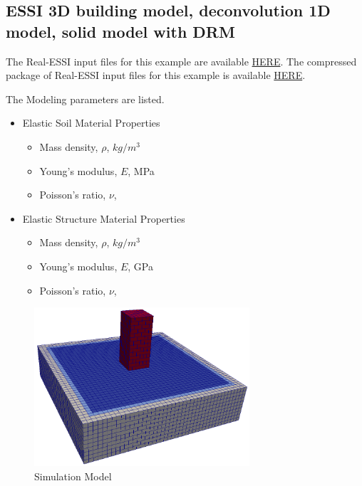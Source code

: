 \clearpage
\newpage
\subsection{ESSI 3D building model, deconvolution 1D model, solid model with DRM}
\label{Earthquake_Soil-Structure_Interaction_3D_Model_with_DRM1}

The Real-ESSI input files for this example are available 
\href{https://github.com/yuan-energy/Real-ESSI-Short-Course-Examples/tree/master/short-course-examples/Day2/Deconvolution_1D_Motions/Earthquake_Soil-Structure_Interaction_3D_Model_with_DRM}{HERE}. 
The compressed package of Real-ESSI input files for this example is available 
\href{https://github.com/yuan-energy/Real-ESSI-Short-Course-Examples/blob/master/short-course-examples/Day2/Deconvolution_1D_Motions/Earthquake_Soil-Structure_Interaction_3D_Model_with_DRM/Earthquake_Soil-Structure_Interaction_3D_Model_with_DRM.tgz?raw=true}{HERE}. 

The Modeling parameters are listed.
\begin{itemize}
  \item Elastic Soil Material Properties 
  \begin{itemize}
    \item Mass density, $\rho$, \enspace {} $kg/m^3$
    \item Young's modulus, $E$, \enspace {} MPa
    \item Poisson's ratio, $\nu$, \enspace {}
  \end{itemize}
  \item Elastic Structure Material Properties 
  \begin{itemize}
    \item Mass density, $\rho$, \enspace {} $kg/m^3$
    \item Young's modulus, $E$, \enspace {} GPa
    \item Poisson's ratio, $\nu$, \enspace {}
  \end{itemize}
\end{itemize}

\begin{figure}[H]
  \centering
  \includegraphics[width = 8cm]{./Figure-files/Day2/Deconvolution_1D_Motions/Earthquake_Soil-Structure_Interaction_3D_Model_with_DRM/overview.png}
  \caption{Simulation Model}
  \label{fig_decon_1D_motion_3D_model2}
\end{figure}


